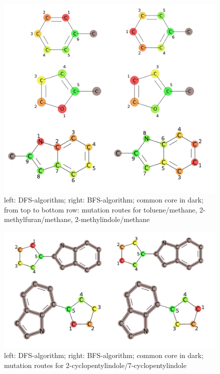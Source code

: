 \begin{figure}[!htb]
	
	\includegraphics[scale=0.75]{paper_routes1a}\caption{left: DFS-algorithm; right: BFS-algorithm; common core in dark; from top to bottom row: mutation routes for toluene/methane, 2-methylfuran/methane, 2-methylindole/methane}
	\label{fig:all_paper_molecules}
\end{figure}


\begin{figure}[!htb]
	
	\includegraphics[scale=0.55]{paper_routes1b}\caption{left: DFS-algorithm; right: BFS-algorithm; common core in dark; mutation routes for 2-cyclopentylindole/7-cyclopentylindole}
	\label{fig:cpi_paper_molecule}
\end{figure}


